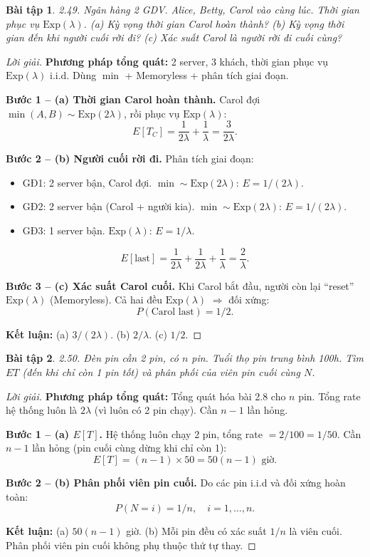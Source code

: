 \documentclass[8pt,a4paper]{article}
\newtheorem{exercise}{Bài tập}
\newenvironment{solution}{\begin{proof}[Lời giải]}{\end{proof}}
\begin{document}
\begin{exercise}
2.49. Ngân hàng 2 GDV. Alice, Betty, Carol vào cùng lúc. Thời gian phục vụ $\text{Exp}(\lambda)$.
(a) Kỳ vọng thời gian Carol hoàn thành? (b) Kỳ vọng thời gian đến khi người cuối rời đi? (c) Xác suất Carol là người rời đi cuối cùng?
\end{exercise}
\begin{solution}
\textbf{Phương pháp tổng quát:} 2 server, 3 khách, thời gian phục vụ $\text{Exp}(\lambda)$ i.i.d. Dùng $\min$ + Memoryless + phân tích giai đoạn.

\textbf{Bước 1 -- (a) Thời gian Carol hoàn thành.} Carol đợi $\min(A, B) \sim \text{Exp}(2\lambda)$, rồi phục vụ $\text{Exp}(\lambda)$:
\[
  E[T_C] = \frac{1}{2\lambda} + \frac{1}{\lambda} = \boxed{\frac{3}{2\lambda}}.
\]

\textbf{Bước 2 -- (b) Người cuối rời đi.} Phân tích giai đoạn:
\begin{itemize}[nosep]
  \item GĐ1: 2 server bận, Carol đợi. $\min \sim \text{Exp}(2\lambda)$: $E = 1/(2\lambda)$.
  \item GĐ2: 2 server bận (Carol + người kia). $\min \sim \text{Exp}(2\lambda)$: $E = 1/(2\lambda)$.
  \item GĐ3: 1 server bận. $\text{Exp}(\lambda)$: $E = 1/\lambda$.
\end{itemize}
\[
  E[\text{last}] = \frac{1}{2\lambda} + \frac{1}{2\lambda} + \frac{1}{\lambda} = \boxed{\frac{2}{\lambda}}.
\]

\textbf{Bước 3 -- (c) Xác suất Carol cuối.} Khi Carol bắt đầu, người còn lại ``reset'' $\text{Exp}(\lambda)$ (Memoryless). Cả hai đều $\text{Exp}(\lambda)$ $\Rightarrow$ đối xứng:
\[
  P(\text{Carol last}) = \boxed{1/2}.
\]

\textbf{Kết luận:} (a) $3/(2\lambda)$. (b) $2/\lambda$. (c) $1/2$.
\end{solution}

\begin{exercise}
2.50. Đèn pin cần 2 pin, có $n$ pin. Tuổi thọ pin trung bình 100h. Tìm $ET$ (đến khi chỉ còn 1 pin tốt) và phân phối của viên pin cuối cùng $N$.
\end{exercise}
\begin{solution}
\textbf{Phương pháp tổng quát:} Tổng quát hóa bài 2.8 cho $n$ pin. Tổng rate hệ thống luôn là $2\lambda$ (vì luôn có 2 pin chạy). Cần $n-1$ lần hỏng.

\textbf{Bước 1 -- (a) $E[T]$.} Hệ thống luôn chạy 2 pin, tổng rate $= 2/100 = 1/50$. Cần $n-1$ lần hỏng (pin cuối cùng dừng khi chỉ còn 1):
\[
  E[T] = (n-1) \times 50 = \boxed{50(n-1) \text{ giờ}}.
\]

\textbf{Bước 2 -- (b) Phân phối viên pin cuối.} Do các pin i.i.d và đối xứng hoàn toàn:
\[
  P(N = i) = \boxed{1/n}, \quad i = 1, \ldots, n.
\]

\textbf{Kết luận:} (a) $50(n-1)$ giờ. (b) Mỗi pin đều có xác suất $1/n$ là viên cuối. Phân phối viên pin cuối không phụ thuộc thứ tự thay.
\end{solution}
\end{document}
